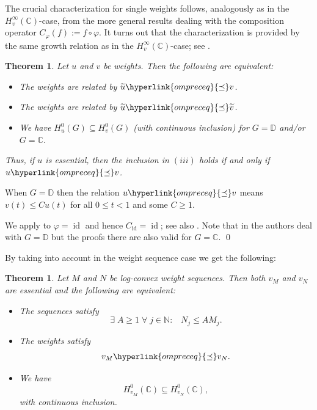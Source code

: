 \documentclass[10pt]{amsart}%
\numberwithin{equation}{section}
\theoremstyle{plain}
\newtheorem{theorem}[proposition]{Theorem}
\newcommand{\CC}{\mathbb{C}}
\newcommand{\NN}{\mathbb{N}}
\newcommand{\id}{\operatorname{id}}
\begin{document}
The crucial characterization for single weights follows, analogously as in the $H^{\infty}_v(\CC)$-case, from the more general results \cite[Prop. 2.1, Cor. 2.2]{BonetDomanskiLindstroemTaskinen98} dealing with the composition operator $C_{\varphi}(f):=f\circ\varphi$. It turns out that the characterization is provided by the same growth relation as in the $H^{\infty}_v(\CC)$-case; see \cite[Thm. 3.2]{weightedentirecharacterization}.

\begin{theorem}\label{essentialweightcharactnew}
	Let $u$ and $v$ be weights. Then the following are equivalent:
	\begin{itemize}
		\item[$(i)$] The weights are related by $\widetilde{u}\hyperlink{ompreceq}{\preceq}v$.
		
		\item[$(ii)$] The weights are related by $\widetilde{u}\hyperlink{ompreceq}{\preceq}\widetilde{v}$.
		
		\item[$(iii)$] We have $H^{0}_u(G)\subseteq H^{0}_v(G)$ (with continuous inclusion) for $G=\mathbb{D}$ and/or $G=\CC$.
	\end{itemize}
	Thus, if $u$ is essential, then the inclusion in $(iii)$ holds if and only if $u\hyperlink{ompreceq}{\preceq}v$.
\end{theorem}

When $G=\mathbb{D}$ then the relation $u\hyperlink{ompreceq}{\preceq}v$ means $v(t)\le C u(t)$ for all $0\le t<1$ and some $C\ge 1$.

We apply \cite[Prop. 1.3. \& 2.1]{BonetDomanskiLindstroemTaskinen98} to $\varphi=\id$ and hence $C_{\id}=\id$; see also \cite[Cor. 2.2]{BonetDomanskiLindstroemTaskinen98}. Note that in \cite[Prop. 1.3 \& 2.1]{BonetDomanskiLindstroemTaskinen98} the authors deal with $G=\mathbb{D}$ but the proofs there are also valid for $G=\CC$.
\qed\enddemo

By taking into account \cite[Thm. 3.4 \& 3.5]{weightedentirecharacterization} in the weight sequence case we get the following:

\begin{theorem}\label{weightholombysequcharactsingle}
	Let $M$ and $N$ be log-convex weight sequences. Then both $v_M$ and $v_N$ are essential and the following are equivalent:
	\begin{itemize}
		\item[$(i)$] The sequences satisfy
		$$\exists\;A\ge 1\;\forall\;j\in\NN:\;\;\;N_j\le AM_j.$$
		
		\item[$(ii)$] The weights satisfy
		$$v_M\hyperlink{ompreceq}{\preceq}v_N.$$
		
		\item[$(iii)$] We have
		$$H^{0}_{v_M}(\CC)\subseteq H^{0}_{v_N}(\CC),$$
		with continuous inclusion.
	\end{itemize}
\end{theorem}
\end{document}
